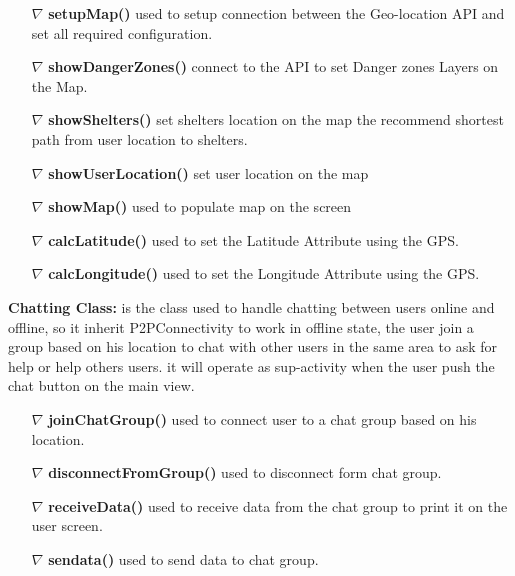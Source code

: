 \documentclass{scrreprt}
\begin{document}
\begin{itemize}
\item[$\nabla$] \textbf{setupMap()} used to setup connection between the Geo-location API and set all required configuration.
\item[$\nabla$] \textbf{showDangerZones()} connect to the API to set Danger zones Layers on the Map. 
\item[$\nabla$] \textbf{showShelters()} set shelters location on the map the recommend shortest path from user location to shelters.
\item[$\nabla$] \textbf{showUserLocation()} set user location on the map
\item[$\nabla$] \textbf{showMap()} used to populate map on the screen
\item[$\nabla$] \textbf{calcLatitude()} used to  set the Latitude Attribute using the GPS.
\item[$\nabla$] \textbf{calcLongitude()} used to  set the Longitude Attribute using the GPS.
\end{itemize}


\textbf{Chatting Class:} is the class used to handle chatting between users online and offline, so it inherit P2PConnectivity to work in offline state, the user join a group based on his location to chat with other users in the same area to ask for help or help others users. it will operate as sup-activity when the user push the chat button on the main view.


\begin{itemize}
\item[$\nabla$]  \textbf{joinChatGroup()} used to connect user to a chat group based on his location.
\item[$\nabla$] \textbf{disconnectFromGroup()} used to disconnect form chat group.
\item[$\nabla$] \textbf{receiveData()} used to receive data from the chat group to print it on the user screen.
\item[$\nabla$] \textbf{sendata()} used to send data to chat group.
\end{itemize}

\end{document}
